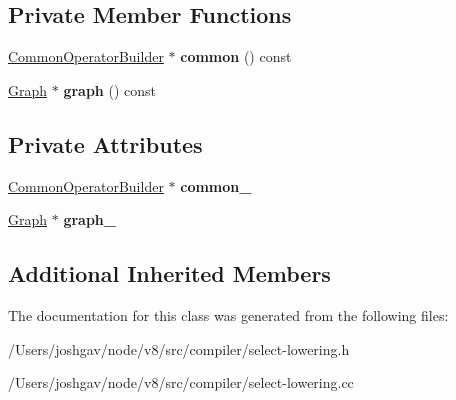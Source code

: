 \subsection*{Private Member Functions}
\begin{DoxyCompactItemize}
\item 
\hyperlink{classv8_1_1internal_1_1compiler_1_1_common_operator_builder}{Common\+Operator\+Builder} $\ast$ {\bfseries common} () const \hypertarget{classv8_1_1internal_1_1compiler_1_1_select_lowering_a0361461f7348bb7f1d851df1ea87ab5f}{}\label{classv8_1_1internal_1_1compiler_1_1_select_lowering_a0361461f7348bb7f1d851df1ea87ab5f}

\item 
\hyperlink{classv8_1_1internal_1_1compiler_1_1_graph}{Graph} $\ast$ {\bfseries graph} () const \hypertarget{classv8_1_1internal_1_1compiler_1_1_select_lowering_a330a25d33fac211427279b097c388736}{}\label{classv8_1_1internal_1_1compiler_1_1_select_lowering_a330a25d33fac211427279b097c388736}

\end{DoxyCompactItemize}
\subsection*{Private Attributes}
\begin{DoxyCompactItemize}
\item 
\hyperlink{classv8_1_1internal_1_1compiler_1_1_common_operator_builder}{Common\+Operator\+Builder} $\ast$ {\bfseries common\+\_\+}\hypertarget{classv8_1_1internal_1_1compiler_1_1_select_lowering_a0313bc90fe1bb2982a460833b8f540a7}{}\label{classv8_1_1internal_1_1compiler_1_1_select_lowering_a0313bc90fe1bb2982a460833b8f540a7}

\item 
\hyperlink{classv8_1_1internal_1_1compiler_1_1_graph}{Graph} $\ast$ {\bfseries graph\+\_\+}\hypertarget{classv8_1_1internal_1_1compiler_1_1_select_lowering_af63bf5baf550e2909093eb1c576291f5}{}\label{classv8_1_1internal_1_1compiler_1_1_select_lowering_af63bf5baf550e2909093eb1c576291f5}

\end{DoxyCompactItemize}
\subsection*{Additional Inherited Members}


The documentation for this class was generated from the following files\+:\begin{DoxyCompactItemize}
\item 
/\+Users/joshgav/node/v8/src/compiler/select-\/lowering.\+h\item 
/\+Users/joshgav/node/v8/src/compiler/select-\/lowering.\+cc\end{DoxyCompactItemize}
